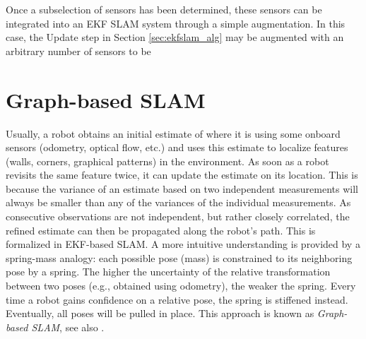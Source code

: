 Once a subselection of sensors has been determined, these sensors can be integrated into an EKF SLAM system through a simple augmentation. In this case, the Update step in Section \ref{sec:ekfslam_alg} may be augmented with an arbitrary number of sensors to be 


\section{Graph-based SLAM}
Usually, a robot obtains an initial estimate of where it is using some onboard sensors (odometry, optical flow, etc.) and uses this estimate to localize features (walls, corners, graphical patterns) in the environment. As soon as a robot revisits the same feature twice, it can update the estimate on its location. This is because the variance of an estimate based on two independent measurements will always be smaller than any of the variances of the individual measurements. As consecutive observations are not independent, but rather closely correlated, the refined estimate can then be propagated along the robot's path. This is formalized in EKF-based SLAM. A more intuitive understanding is provided by a spring-mass analogy: each possible pose (mass) is constrained to its neighboring pose by a spring. The higher the uncertainty of the relative transformation between two poses (e.g., obtained using odometry), the weaker the spring. Every time a robot gains confidence on a relative pose, the spring is stiffened instead. Eventually, all poses will be pulled in place. This approach is known as \emph{Graph-based SLAM}, see also \cite{grisetti2010tutorial}. 

